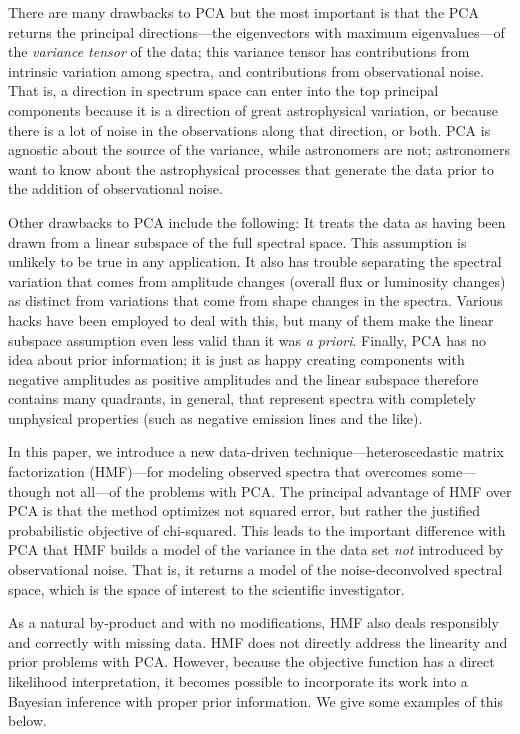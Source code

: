 \documentclass[12pt,preprint]{aastex}
\begin{document}
There are many drawbacks to PCA but the most important is that the PCA
returns the principal directions---the eigenvectors with maximum
eigenvalues---of the \emph{variance tensor} of the data; this variance
tensor has contributions from intrinsic variation among spectra, and
contributions from observational noise.  That is, a direction in
spectrum space can enter into the top principal components because it
is a direction of great astrophysical variation, or because there is a
lot of noise in the observations along that direction, or both.  PCA
is agnostic about the source of the variance, while astronomers are
not; astronomers want to know about the astrophysical processes that
generate the data prior to the addition of observational noise.

Other drawbacks to PCA include the following: It treats the data as
having been drawn from a linear subspace of the full spectral
space. This assumption is unlikely to be true in any application.  It
also has trouble separating the spectral variation that comes from
amplitude changes (overall flux or luminosity changes) as distinct
from variations that come from shape changes in the spectra.  Various
hacks have been employed to deal with this, but many of them make the
linear subspace assumption even less valid than it was \textit{a
  priori}. Finally, PCA has no idea about prior information; it is
just as happy creating components with negative amplitudes as positive
amplitudes and the linear subspace therefore contains many quadrants,
in general, that represent spectra with completely unphysical
properties (such as negative emission lines and the like).

In this paper, we introduce a new data-driven
technique---heteroscedastic matrix factorization (HMF)---for modeling
observed spectra that overcomes some---though not all---of the
problems with PCA.  The principal advantage of HMF over PCA is that
the method optimizes not squared error, but rather the justified
probabilistic objective of chi-squared.  This leads to the important
difference with PCA that HMF builds a model of the variance in the
data set \emph{not} introduced by observational noise.  That is, it
returns a model of the noise-deconvolved spectral space, which is the
space of interest to the scientific investigator.

As a natural by-product and with no modifications, HMF also deals
responsibly and correctly with missing data.  HMF does not directly
address the linearity and prior problems with PCA.  However, because
the objective function has a direct likelihood interpretation, it
becomes possible to incorporate its work into a Bayesian inference
with proper prior information.  We give some examples of this below.
\end{document}
